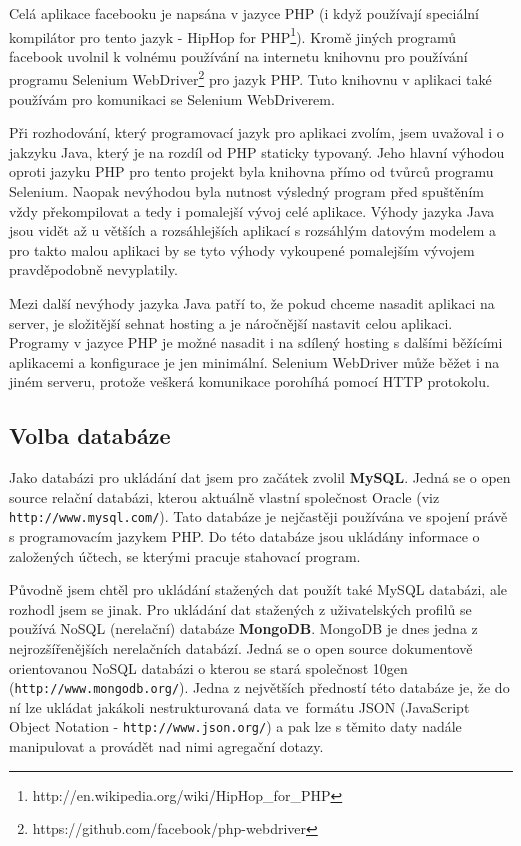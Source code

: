 \documentclass[thesis=M,czech]{FITthesis}[2013/05/10]
\begin{document}
Celá aplikace facebooku je napsána v jazyce PHP (i když používají speciální kompilátor pro tento jazyk - HipHop for PHP\footnote{http://en.wikipedia.org/wiki/HipHop\_for\_PHP}). Kromě jiných programů facebook uvolnil k volnému používání na internetu knihovnu pro používání programu Selenium WebDriver\footnote{https://github.com/facebook/php-webdriver} pro jazyk PHP. Tuto knihovnu v aplikaci také používám pro komunikaci se Selenium WebDriverem.

Při rozhodování, který programovací jazyk pro aplikaci zvolím, jsem uvažoval i o jakzyku Java, který je na rozdíl od PHP staticky typovaný. Jeho hlavní výhodou oproti jazyku PHP pro tento projekt byla knihovna přímo od tvůrců programu Selenium. Naopak nevýhodou byla nutnost výsledný program před spuštěním vždy překompilovat a tedy i pomalejší vývoj celé aplikace. Výhody jazyka Java jsou vidět až u větších a rozsáhlejších aplikací s rozsáhlým datovým modelem a pro takto malou aplikaci by se tyto výhody vykoupené pomalejším vývojem pravděpodobně nevyplatily. 

Mezi další nevýhody jazyka Java patří to, že pokud chceme nasadit aplikaci na server, je složitější sehnat hosting a je náročnější nastavit celou aplikaci. Programy v jazyce PHP je možné nasadit i na sdílený hosting s dalšími běžícími aplikacemi a konfigurace je jen minimální. Selenium WebDriver může běžet i na jiném serveru, protože veškerá komunikace porohíhá pomocí HTTP protokolu.

\subsection{Volba databáze}

Jako databázi pro ukládání dat jsem pro začátek zvolil \textbf{MySQL}. Jedná se o open source relační databázi, kterou aktuálně vlastní společnost Oracle (viz \verb|http://www.mysql.com/|). Tato databáze je nejčastěji používána ve spojení právě s programovacím jazykem PHP. Do této databáze jsou ukládány informace o založených účtech, se kterými pracuje stahovací program.

Původně jsem chtěl pro ukládání stažených dat použít také MySQL databázi, ale rozhodl jsem se jinak. Pro ukládání dat stažených z uživatelských profilů se používá NoSQL (nerelační) databáze \textbf{MongoDB}. MongoDB je dnes jedna z nejrozšířenějších nerelačních databází. Jedná se o open source dokumentově orientovanou NoSQL databázi o kterou se stará společnost 10gen (\verb|http://www.mongodb.org/|). Jedna z největších předností této databáze je, že do ní lze ukládat jakákoli nestrukturovaná data ve~formátu JSON (JavaScript Object Notation - \verb|http://www.json.org/|) a pak lze s těmito daty nadále manipulovat a provádět nad nimi agregační dotazy. 
\end{document}
